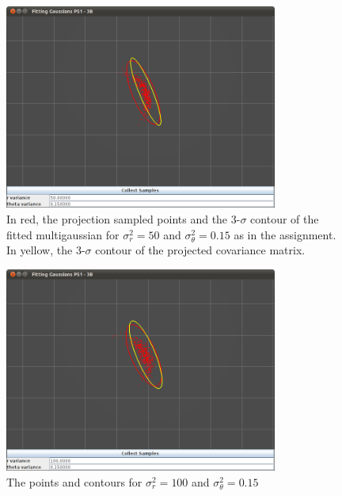 \documentclass[12pt]{article}
\begin{document}
\begin{figure}
\centering
\includegraphics[width=0.8\textwidth]{figures/GaussianFit_50_0_15.png}
\caption{In red, the projection sampled points and the 3-$\sigma$ contour of the fitted multigaussian for $\sigma^2_r=50$ and $\sigma^2_\theta=0.15$ as in the assignment. In yellow, the 3-$\sigma$ contour of the projected covariance matrix.}
\label{fig:covplot_50_15}
\end{figure}

\begin{figure}
\centering
\includegraphics[width=0.8\textwidth]{figures/GaussianFit_100_0_15.png}
\caption{The points and contours for $\sigma^2_r=100$ and $\sigma^2_\theta=0.15$}
\label{fig:covplot_100_15}
\end{figure}
\end{document}
